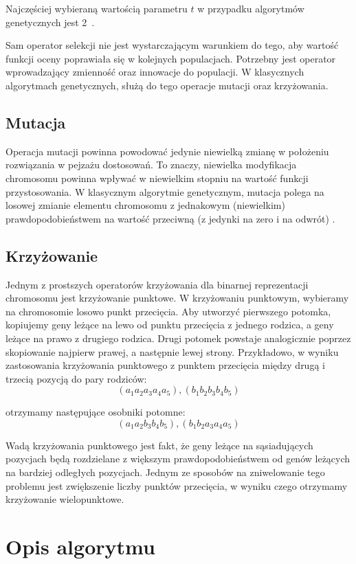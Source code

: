 \documentclass[brudnopis]{xmgr}
\begin{document}
Najczęściej wybieraną wartością parametru $t$ w przypadku algorytmów genetycznych jest 2~\cite{Luke2009Metaheuristics}.

Sam operator selekcji nie jest wystarczającym warunkiem do tego, aby wartość funkcji oceny poprawiała się w kolejnych populacjach. Potrzebny jest operator wprowadzający zmienność oraz innowacje do populacji. W klasycznych algorytmach genetycznych, służą do tego operacje mutacji oraz krzyżowania.

\section{Mutacja}

Operacja mutacji powinna powodować jedynie niewielką zmianę w położeniu rozwiązania w pejzażu dostosowań. To znaczy, niewielka modyfikacja chromosomu powinna wpływać w niewielkim stopniu na wartość funkcji przystosowania. W klasycznym algorytmie genetycznym, mutacja polega na losowej zmianie elementu chromosomu z jednakowym (niewielkim) prawdopodobieństwem na wartość przeciwną (z jedynki na zero i na odwrót) \cite{Goldberg:1998:AGZ}.

\section{Krzyżowanie}

Jednym z prostszych operatorów krzyżowania dla binarnej reprezentacji chromosomu jest krzyżowanie punktowe. W krzyżowaniu punktowym, wybieramy na chromosomie losowo punkt przecięcia. Aby utworzyć pierwszego potomka, kopiujemy geny leżące na lewo od punktu przecięcia z jednego rodzica, a geny leżące na prawo z drugiego rodzica. Drugi potomek powstaje analogicznie poprzez skopiowanie najpierw prawej, a następnie lewej strony. Przykładowo, w wyniku zastosowania krzyżowania punktowego z punktem przecięcia między drugą i trzecią pozycją do pary rodziców:
$$(a_1 a_2 a_3 a_4 a_5), (b_1 b_2 b_3 b_4 b_5)$$

otrzymamy następujące osobniki potomne:
$$(a_1 a_2 b_3 b_4 b_5), (b_1 b_2 a_3 a_4 a_5)$$

Wadą krzyżowania punktowego jest fakt, że geny leżące na sąsiadujących pozycjach będą rozdzielane z większym prawdopodobieństwem od genów leżących na bardziej odległych pozycjach. Jednym ze sposobów na zniwelowanie tego problemu jest zwiększenie liczby punktów przecięcia, w wyniku czego otrzymamy krzyżowanie wielopunktowe.


\chapter{Opis algorytmu}
\end{document}
